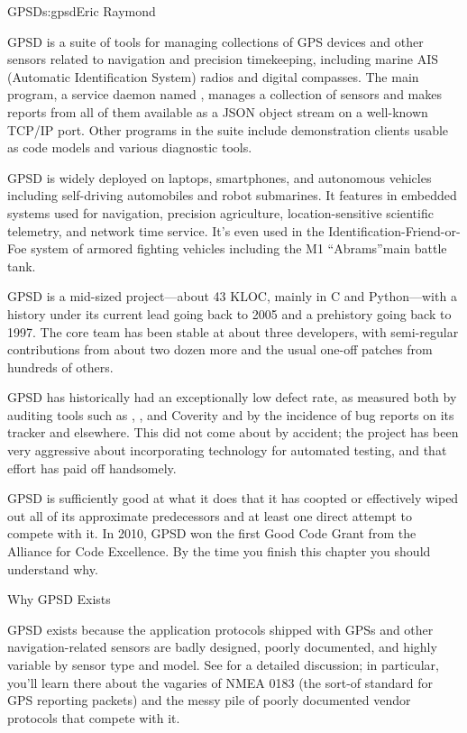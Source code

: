 \begin{aosachapter}{GPSD}{s:gpsd}{Eric Raymond}


GPSD is a suite of tools for managing collections of GPS devices and other
sensors related to navigation and precision timekeeping, including
marine AIS (Automatic Identification System) radios and digital compasses. The main program, a service
daemon named , manages a collection of sensors and makes
reports from all of them available as a JSON object stream on a
well-known TCP/IP port.  Other programs in the suite include 
demonstration clients usable as code models and various diagnostic
tools.

GPSD is widely deployed on laptops, smartphones, and autonomous
vehicles including self-driving automobiles and robot submarines. It
features in embedded systems used for navigation, precision
agriculture, location-sensitive scientific telemetry, and network time
service. It's even used in the Identification-Friend-or-Foe system of
armored fighting vehicles including the M1 ``Abrams''main battle tank.

GPSD is a mid-sized project---about 43 KLOC, mainly in C and
Python---with a history under its current lead going back to 2005 and a
prehistory going back to 1997.  The core team has been stable at about
three developers, with semi-regular contributions from about two dozen
more and the usual one-off patches from hundreds of others.

GPSD has historically had an exceptionally low defect rate, as
measured both by auditing tools such as , , and Coverity
and by the incidence of bug reports on its tracker and elsewhere.
This did not come about by accident; the project has been very
aggressive about incorporating technology for automated testing, and
that effort has paid off handsomely.

GPSD is sufficiently good at what it does that it has coopted or
effectively wiped out all of its approximate predecessors and at least
one direct attempt to compete with it.  In 2010, GPSD won the first
Good Code Grant from the Alliance for Code Excellence.  By the time
you finish this chapter you should understand why.

\begin{aosasect1}{Why GPSD Exists}

GPSD exists because the application protocols shipped with GPSs and
other navigation-related sensors are badly designed, poorly
documented, and highly variable by sensor type and model. See
\cite{bib:gps-suck} for a detailed discussion; in particular, you'll 
learn there about the vagaries of NMEA 0183 (the sort-of standard for
GPS reporting packets) and the messy pile of poorly documented vendor
protocols that compete with it. 


\end{aosasect1}
\end{aosachapter}
